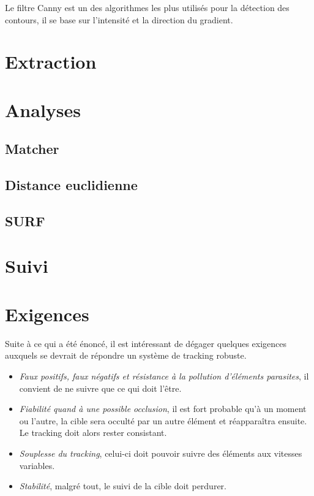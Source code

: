 \documentclass[a4paper,12pt]{report}
\begin{document}
     


Le filtre Canny est un des algorithmes les plus utilisés pour la détection des contours, il se base sur l'intensité et la direction du gradient. \\

\section{Extraction}

\section{Analyses}
\subsection{Matcher}
\subsection{Distance euclidienne}
\subsection{SURF}

\section{Suivi}


\section{Exigences}
Suite à ce qui a été énoncé, il est intéressant de dégager quelques exigences auxquels se devrait de répondre un système de tracking robuste. 
\begin{itemize}
\item \textit{Faux positifs, faux négatifs et résistance à la pollution d'éléments parasites}, il convient de ne suivre que ce qui doit l'être.
\item \textit{Fiabilité quand à une possible occlusion}, il est fort probable qu'à un moment ou l'autre, la cible sera occulté par un autre élément et réapparaîtra ensuite. Le tracking doit alors rester consistant.
\item \textit{Souplesse du tracking}, celui-ci doit pouvoir suivre des éléments aux vitesses variables.
\item \textit{Stabilité}, malgré tout, le suivi de la cible doit perdurer.
\end{itemize}
\end{document}
